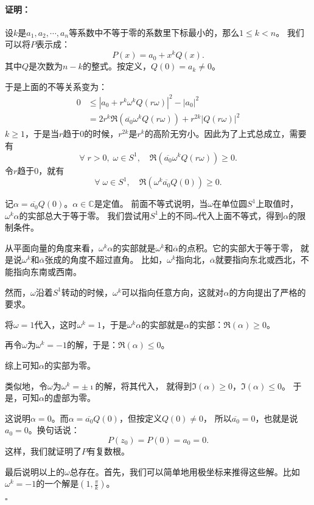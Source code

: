 \documentclass[12pt,UTF8]{ctexbook}
\theoremstyle{definition}
\theoremstyle{plain}
\renewenvironment{proof}{\paragraph{\textbf{证明：}}}{\hfill$\square$}
\begin{document}
\begin{appendix}
\begin{proof}
    设$k$是$a_1, a_2, \cdots, a_n$等系数中不等于零的系数里下标最小的，那么$1\leqslant k < n$。
    我们可以将$P$表示成：
    $$ P(x) = a_0 + x^k Q(x). $$
    其中$Q$是次数为$n - k$的整式。按定义，$Q(0) = a_k \neq 0$。

    于是上面的不等关系变为：
    \begin{align*}
        0 &\leqslant |a_0 + r^k \omega^k Q(r\omega)|^2 - |a_0|^2 \\
          &= 2r^k \Re(\overline{a_0} \omega^k Q(r\omega)) + r^{2k}|Q(r\omega)|^2 
    \end{align*}
    $k\geqslant 1$，于是当$r$趋于$0$的时候，$r^{2k}$是$r^k$的高阶无穷小。因此为了上式总成立，需要有
    $$ \forall \; r > 0,\; \omega \in S^1,\quad \Re(\overline{a_0} \omega^k Q(r\omega)) \geqslant 0. $$
    令$r$趋于$0$，就有
    $$ \forall \; \omega \in S^1,\quad \Re(\omega^k\overline{a_0} Q(0)) \geqslant 0. $$

    记$\alpha = \overline{a_0} Q(0)$。$\alpha \in\mathbb{C}$是定值。
    前面不等式说明，当$\omega$在单位圆$S^1$上取值时，$\omega^k \alpha$的实部总大于等于零。
    我们尝试用$S^1$上的不同$\omega$代入上面不等式，得到$\alpha$的限制条件。

    从平面向量的角度来看，$\omega^k \alpha$的实部就是$\omega^k$和$\overline{\alpha}$的点积。它的实部大于等于零，
    就是说$\omega^k$和$\overline{\alpha}$张成的角度不超过直角。
    比如，$\omega^k$指向北，$\overline{\alpha}$就要指向东北或西北，不能指向东南或西南。

    然而，$\omega$沿着$S^1$转动的时候，$\omega^k$可以指向任意方向，这就对$\alpha$的方向提出了严格的要求。

    将$\omega = 1$代入，这时$\omega^k = 1$，于是$\omega^k \alpha$的实部就是$\alpha$的实部：$\Re(\alpha) \geqslant 0$。

    再令$\omega$为$\omega^k = -1$的解，于是：$\Re(\alpha) \leqslant 0$。%

    综上可知$\alpha$的实部为零。

    类似地，令$\omega$为$\omega^k = \pm \imath$的解，将其代入，%
    就得到$\Im(\alpha) \geqslant 0$，$\Im(\alpha) \leqslant 0$。
    于是，可知$\alpha$的虚部为零。

    这说明$\alpha = 0$。而$\alpha = \overline{a_0} Q(0)$，但按定义$Q(0)\neq 0$，
    所以$\overline{a_0} = 0$，也就是说$a_0 = 0$。换句话说：
    $$ P(z_0) = P(0) = a_0 = 0. $$
    这样，我们就证明了$P$有复数根。

    最后说明以上的$\omega$总存在。首先，我们可以简单地用极坐标来推得这些解。比如$\omega^k = -1$的一个解是$\left(1, \frac{\pi}{k}\right)$。
    

\end{proof}
\end{appendix}
\end{document}
